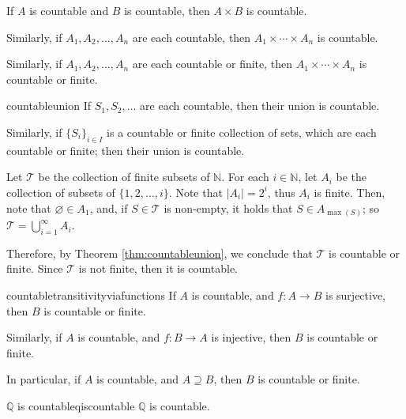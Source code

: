 
\begin{thm}{}{}
	If \(A\) is countable and \(B\) is countable, then \(A \times B\) is countable.

	Similarly, if \(A_1, A_2, \dots, A_n\) are each countable, then \(A_1 \times \cdots \times A_n\) is countable.
	
	Similarly, if \(A_1, A_2, \dots, A_n\) are each countable or finite, then \(A_1 \times \cdots \times A_n\) is countable or finite.
\end{thm}

\begin{thm}{}{countableunion}
	If \(S_1, S_2, \dots\) are each countable, then their union is countable.

	Similarly, if \(\{S_i\}_{i \in I}\) is a countable or finite collection of sets, which are each countable or finite; then their union is countable.
\end{thm}

\begin{exmp}{}{}
	Let \(\mathcal{T}\) be the collection of finite subsets of \(\mathbb{N}\). For each \(i \in \mathbb{N}\), let \(A_i\) be the collection of subsets of \(\{1, 2, \dots, i\}\). Note that \(|A_i| = 2^i\), thus \(A_i\) is finite. Then, note that \(\varnothing \in A_1\), and, if \(S \in \mathcal{T}\) is non-empty, it holds that \(S \in A_{\max(S)}\); so \(\mathcal{T} = \bigcup_{i=1}^\infty A_i\).
	
	Therefore, by Theorem \ref{thm:countableunion}, we conclude that \(\mathcal{T}\) is countable or finite. Since \(\mathcal{T}\) is not finite, then it is countable.
\end{exmp}

\begin{thm}{}{countabletransitivityviafunctions}
	If \(A\) is countable, and \(f: A \to B\) is surjective, then \(B\) is countable or finite.
	
	Similarly, if \(A\) is countable, and \(f: B \to A\) is injective, then \(B\) is countable or finite.

	In particular, if \(A\) is countable, and \(A \supseteq B\), then \(B\) is countable or finite.
\end{thm}


\begin{prop}{\(\mathbb{Q}\) is countable}{qiscountable}
	\(\mathbb{Q}\) is countable.
\end{prop}

